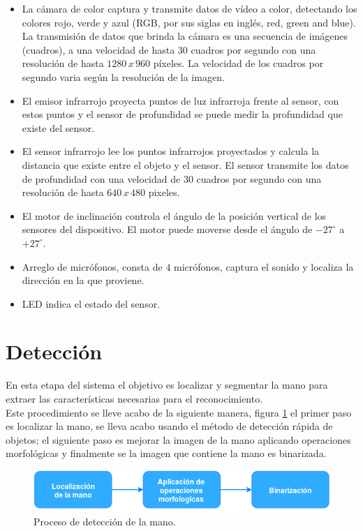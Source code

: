 \begin{itemize}
\item La cámara de color captura y transmite datos de vídeo a color, detectando los colores rojo, verde y azul (RGB, por sus siglas en ingl\'es, red, green and blue). La transmisión de datos que brinda la cámara es una secuencia de imágenes (cuadros), a una velocidad de hasta $30$ cuadros por segundo con una resolución de hasta $1280\, x \, 960$ p\'ixeles. La velocidad de los cuadros por segundo varia según la resolución de la imagen.
\item El emisor infrarrojo proyecta puntos de luz infrarroja frente al sensor, con estos puntos y el sensor de profundidad se puede medir la profundidad que existe del sensor.
\item El sensor infrarrojo lee los puntos infrarrojos proyectados y calcula la distancia que existe entre el objeto y el sensor. El sensor transmite los datos de profundidad con una velocidad de $30$ cuadros por segundo con una resolución de hasta $640 \, x \, 480$ pixeles.   
\item El motor de inclinación controla el \'angulo de la posición vertical de los sensores del dispositivo. El motor puede moverse desde el \'angulo de $-27^ \circ$ a $+27^\circ$. 
\item Arreglo de micrófonos, consta de $4$ micrófonos, captura el sonido y localiza la dirección en la que proviene. 
\item LED indica el estado del sensor.
\end{itemize}




 
\section{Detección}\label{sec:Detection}

En esta etapa del sistema el objetivo es localizar y segmentar la mano para extraer las características necesarias para el reconocimiento.\\
Este procedimiento se lleve acabo de la siguiente manera, figura  \ref{fig:ProcesoDeteccion} el primer paso es localizar la mano, se lleva acabo usando el método de detección rápida de objetos; el siguiente paso es mejorar la imagen de la mano aplicando operaciones morfológicas y finalmente se la imagen que contiene la mano es binarizada. 

\begin{figure}[h!]
\begin{center}
\includegraphics[scale=.7]{./Figures/Detection.png}
\end{center}
\caption{Proceso de detección de la mano.}
\label{fig:ProcesoDeteccion}
\end{figure} 


